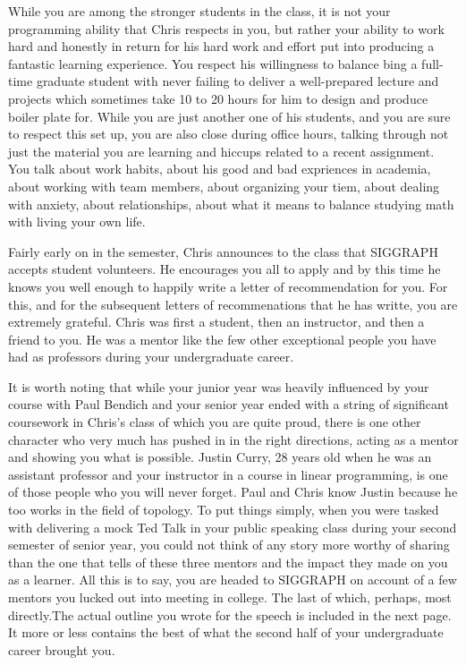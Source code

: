 \documentclass[../main.tex]{subfiles}
\begin{document}
While you are among the stronger students in the class, it is not your programming ability that Chris respects in you, but rather your ability to work hard and honestly in return for his hard work and effort put into producing a fantastic learning experience. You respect his willingness to balance bing a full-time graduate student with never failing to deliver a well-prepared lecture and projects which sometimes take 10 to 20 hours for him to design and produce boiler plate for. While you are just another one of his students, and you are sure to respect this set up, you are also close during office hours, talking through not just the material you are learning and hiccups related to a recent assignment. You talk about work habits, about his good and bad expriences in academia, about working with team members, about organizing your tiem, about dealing with anxiety, about relationships, about what it means to balance studying math with living your own life.

Fairly early on in the semester, Chris announces to the class that SIGGRAPH accepts student volunteers. He encourages you all to apply and by this time he knows you well enough to happily write a letter of recommendation for you. For this, and for the subsequent letters of recommenations that he has writte, you are extremely grateful. Chris was first a student, then an instructor, and then a friend to you. He was a mentor like the few other exceptional people you have had as professors during your undergraduate career.

It is worth noting that while your junior year was heavily influenced by your course with Paul Bendich and your senior year ended with a string of significant coursework in Chris's class of which you are quite proud, there is one other character who very much has pushed in in the right directions, acting as a mentor and showing you what is possible. Justin Curry, 28 years old when he was an assistant professor and your instructor in a course in linear programming, is one of those people who you will never forget. Paul and Chris know Justin because he too works in the field of topology. To put things simply, when you were tasked with delivering a mock Ted Talk in your public speaking class during your second semester of senior year, you could not think of any story more worthy of sharing than the one that tells of these three mentors and the impact they made on you as a learner. All this is to say, you are headed to SIGGRAPH on account of a few mentors you lucked out into meeting in college. The last of which, perhaps, most directly.The actual outline you wrote for the speech is included in the next page. It more or less contains the best of what the second half of your undergraduate career brought you.


\end{document}
